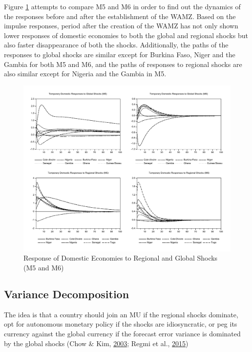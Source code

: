 \documentclass[]{article}
\begin{document}
Figure \ref{fig:FigM5M6} attempts to compare M5 and M6 in order to find out the dynamics of the responses before and after the establishment of the WAMZ. Based on the impulse responses, period after the creation of the WAMZ has not only shown lower responses of domestic economies to both the global and regional shocks but also faster disappearance of both the shocks. Additionally, the paths of the responses to global shocks are similar except for Burkina Faso, Niger and the Gambia for both M5 and M6, and the paths of responses to regional shocks are also similar except for Nigeria and the Gambia in M5.

\begin{figure}[ht]

{\centering \includegraphics[width=0.98\linewidth,height=0.9\textheight]{FIGURES/figure2} 

}

\caption{Response of Domestic Economies to Regional and Global Shocks (M5 and M6)}\label{fig:FigM5M6}
\end{figure}

\FloatBarrier

\hypertarget{variance-decomposition}{%
\subsection{Variance Decomposition}\label{variance-decomposition}}

The idea is that a country should join an MU if the regional shocks dominate, opt for autonomous monetary policy if the shocks are idiosyncratic, or peg its currency against the global currency if the forecast error variance is dominated by the global shocks (Chow \& Kim, \protect\hyperlink{ref-Chow2003}{2003}; Regmi et al., \protect\hyperlink{ref-Regmi2015}{2015})
\end{document}
